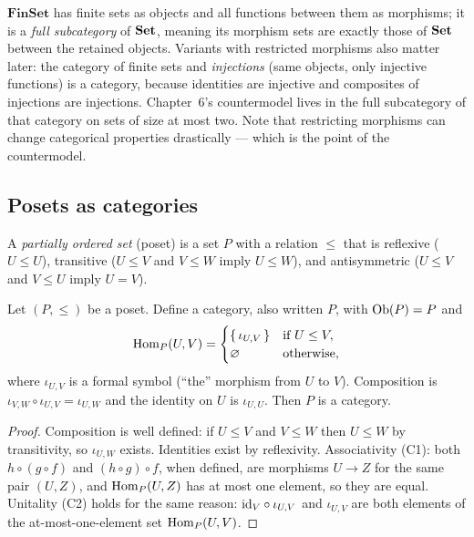\begin{example}\label{ch02:ex:finset}
$\mathbf{FinSet}$ has finite sets as objects and all functions between
them as morphisms; it is a \emph{full subcategory} of $\mathbf{Set}$, meaning its
morphism sets are exactly those of $\mathbf{Set}$ between the retained objects.
Variants with restricted morphisms also matter later: the category of
finite sets and \emph{injections} (same objects, only injective functions)
is a category, because identities are injective and composites of
injections are injections. Chapter~6's countermodel lives in the full
subcategory of that category on sets of size at most two. Note that
restricting morphisms can change categorical properties drastically ---
which is the point of the countermodel.
\end{example}

\subsection{Posets as categories}\label{ch02:sec:posets-as-cats}

\begin{definition}[Poset]\label{ch02:def:poset}
A \emph{partially ordered set} (poset) is a set $P$ with a relation
$\le$ that is reflexive ($U \le U$), transitive ($U \le V$ and $V \le W$
imply $U \le W$), and antisymmetric ($U \le V$ and $V \le U$ imply
$U = V$).
\end{definition}

\begin{proposition}\label{ch02:prop:poset-category}
Let $(P, \le)$ be a poset. Define a category, also written $P$, with
$\mathrm{Ob}(P) = P$ and
\[
\mathrm{Hom}_P(U, V) =
\begin{cases}
\{\, \iota_{U,V} \,\} & \text{if } U \le V, \\
\varnothing & \text{otherwise,}
\end{cases}
\]
where $\iota_{U,V}$ is a formal symbol (``the'' morphism from $U$ to
$V$). Composition is $\iota_{V,W} \circ \iota_{U,V} = \iota_{U,W}$ and
the identity on $U$ is $\iota_{U,U}$. Then $P$ is a category.
\end{proposition}

\begin{proof}
Composition is well defined: if $U \le V$ and $V \le W$ then $U \le W$ by
transitivity, so $\iota_{U,W}$ exists. Identities exist by reflexivity.
Associativity (C1): both $h \circ (g \circ f)$ and $(h \circ g) \circ f$,
when defined, are morphisms $U \to Z$ for the same pair $(U, Z)$, and
$\mathrm{Hom}_P(U, Z)$ has at most one element, so they are equal. Unitality (C2)
holds for the same reason: $\mathrm{id}_V \circ \iota_{U,V}$ and $\iota_{U,V}$
are both elements of the at-most-one-element set $\mathrm{Hom}_P(U,V)$.
\end{proof}

